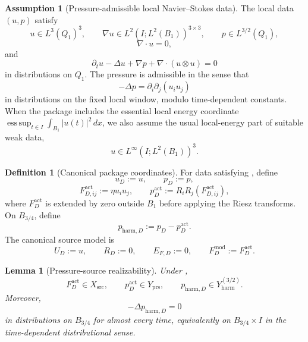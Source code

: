 \documentclass[11pt]{article}
\numberwithin{equation}{section}
\newtheorem{lemma}[lemma]{Lemma}
\theoremstyle{definition}
\newtheorem{definition}[definition]{Definition}
\newtheorem{assumption}[assumption]{Assumption}
\theoremstyle{remark}
\newcommand{\src}{\mathrm{src}}
\begin{document}
\begin{assumption}[Pressure-admissible local Navier--Stokes data]
\label{ass:realizable-ns-data}
The local data \((u,p)\) satisfy
\[
    u\in L^3(Q_1)^3,
    \qquad
    \nabla u\in L^2(I;L^2(B_1))^{3\times3},
    \qquad
    p\in L^{3/2}(Q_1),
\]
\[
    \nabla\cdot u=0,
\]
and
\[
    \partial_tu-\Delta u+\nabla p+\nabla\cdot(u\otimes u)=0
\]
in distributions on \(Q_1\).  The pressure is admissible in the sense that
\[
    -\Delta p=\partial_i\partial_j(u_i u_j)
\]
in distributions on the fixed local window, modulo time-dependent constants.
When the package includes the essential local energy coordinate
\(\operatorname*{ess\,sup}_{t\in I}\int_{B_1}|u(t)|^2\,dx\), we also assume the
usual local-energy part of suitable weak data,
\[
    u\in L^\infty(I;L^2(B_1))^3.
\]
\end{assumption}

\begin{definition}[Canonical package coordinates]
\label{def:canonical-package-map}
For data satisfying , define
\[
    u_D:=u,
    \qquad
    p_D:=p,
\]
\[
    F^{\mathrm{act}}_{D,ij}:=\eta u_i u_j,
    \qquad
    p_D^{\mathrm{act}}:=R_iR_j(F^{\mathrm{act}}_{D,ij}),
\]
where \(F_D^{\mathrm{act}}\) is extended by zero outside \(B_1\) before applying
the Riesz transforms.  On \(B_{3/4}\), define
\[
    p_{\mathrm{harm},D}:=p_D-p_D^{\mathrm{act}}.
\]
The canonical source model is
\[
    U_D:=u,
    \qquad
    R_D:=0,
    \qquad
    E_{F,D}:=0,
    \qquad
    F^{\mathrm{mod}}_{D}:=F_D^{\mathrm{act}}.
\]
\end{definition}

\begin{lemma}[Pressure-source realizability]
\label{lem:pressure-source-realizability}
Under ,
\[
    F_D^{\mathrm{act}}\in X_{\src},
    \qquad
    p_D^{\mathrm{act}}\in Y_{\mathrm{prs}},
    \qquad
    p_{\mathrm{harm},D}\in Y_{\mathrm{harm}}^{(3/2)}.
\]
Moreover,
\[
    -\Delta p_{\mathrm{harm},D}=0
\]
in distributions on \(B_{3/4}\) for almost every time, equivalently on
\(B_{3/4}\times I\) in the time-dependent distributional sense.
\end{lemma}
\end{document}
